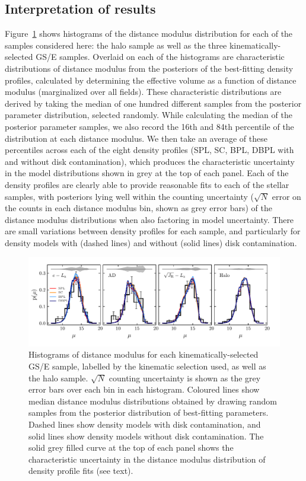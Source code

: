 \subsection{Interpretation of results}
\label{ch3:subsec:interpretation-of-results}

Figure~\ref{ch3:fig:pdistmod} shows histograms of the distance modulus distribution for each of the samples considered here: the halo sample as well as the three kinematically-selected GS/E samples. Overlaid on each of the histograms are characteristic distributions of distance modulus from the posteriors of the best-fitting density profiles, calculated by determining the effective volume as a function of distance modulus (marginalized over all fields). These characteristic distributions are derived by taking the median of one hundred different samples from the posterior parameter distribution, selected randomly. While calculating the median of the posterior parameter samples, we also record the 16th and 84th percentile of the distribution at each distance modulus. We then take an average of these percentiles across each of the eight density profiles (SPL, SC, BPL, DBPL with and without disk contamination), which produces the characteristic uncertainty in the model distributions shown in grey at the top of each panel. Each of the density profiles are clearly able to provide reasonable fits to each of the stellar samples, with posteriors lying well within the counting uncertainty ($\sqrt{N}$ error on the counts in each distance modulus bin, shown as grey error bars) of the distance modulus distributions when also factoring in model uncertainty. There are small variations between density profiles for each sample, and particularly for density models with (dashed lines) and without (solid lines) disk contamination. 

\begin{figure}
    \centering
    \includegraphics[width=\textwidth]{figure/ch3/pdistmod.pdf}
    \caption{Histograms of distance modulus for each kinematically-selected GS/E sample, labelled by the kinematic selection used, as well as the halo sample. $\sqrt{N}$ counting uncertainty is shown as the grey error bars over each bin in each histogram. Coloured lines show median distance modulus distributions obtained by drawing random samples from the posterior distribution of best-fitting parameters. Dashed lines show density models with disk contamination, and solid lines show density models without disk contamination. The solid grey filled curve at the top of each panel shows the characteristic uncertainty in the distance modulus distribution of density profile fits (see text).}
    \label{ch3:fig:pdistmod}
\end{figure}

